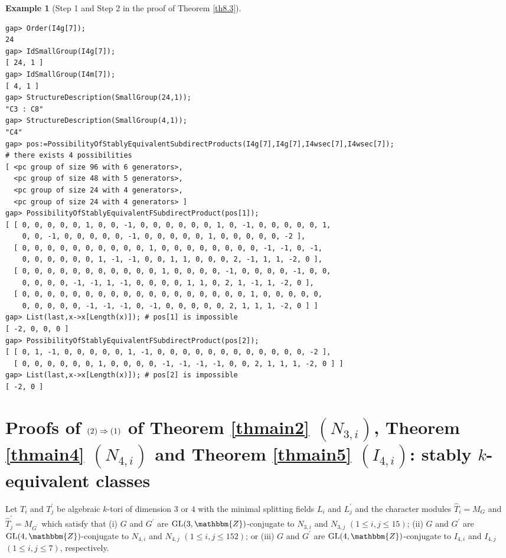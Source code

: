 \documentclass{amsart}
\theoremstyle{plain}
\theoremstyle{definition}
\newtheorem{example}[theorem]{Example}
\theoremstyle{remark}
\newcommand{\bZ}{\mathbbm{Z}}\newcommand{\bQ}{\mathbbm{Q}}
\newcommand{\GL}{{\rm GL}}\newcommand{\SL}{{\rm SL}}
\newcounter{sub}\def\tr{\mbox{tr }}
\begin{document}
{\begin{example}[Step 1 and Step 2 in the proof of Theorem \ref{th8.3}]
\begin{verbatim}
gap> Order(I4g[7]);
24
gap> IdSmallGroup(I4g[7]);
[ 24, 1 ]
gap> IdSmallGroup(I4m[7]);
[ 4, 1 ]
gap> StructureDescription(SmallGroup(24,1));
"C3 : C8"
gap> StructureDescription(SmallGroup(4,1));
"C4"
gap> pos:=PossibilityOfStablyEquivalentSubdirectProducts(I4g[7],I4g[7],I4wsec[7],I4wsec[7]);
# there exists 4 possibilities 
[ <pc group of size 96 with 6 generators>, 
  <pc group of size 48 with 5 generators>, 
  <pc group of size 24 with 4 generators>, 
  <pc group of size 24 with 4 generators> ]
gap> PossibilityOfStablyEquivalentFSubdirectProduct(pos[1]);
[ [ 0, 0, 0, 0, 0, 1, 0, 0, -1, 0, 0, 0, 0, 0, 0, 1, 0, -1, 0, 0, 0, 0, 0, 1, 
    0, 0, -1, 0, 0, 0, 0, 0, -1, 0, 0, 0, 0, 0, 1, 0, 0, 0, 0, 0, -2 ], 
  [ 0, 0, 0, 0, 0, 0, 0, 0, 0, 0, 1, 0, 0, 0, 0, 0, 0, 0, 0, -1, -1, 0, -1, 
    0, 0, 0, 0, 0, 0, 1, -1, -1, 0, 0, 1, 1, 0, 0, 0, 2, -1, 1, 1, -2, 0 ], 
  [ 0, 0, 0, 0, 0, 0, 0, 0, 0, 0, 0, 1, 0, 0, 0, 0, -1, 0, 0, 0, 0, -1, 0, 0, 
    0, 0, 0, 0, -1, -1, 1, -1, 0, 0, 0, 0, 1, 1, 0, 2, 1, -1, 1, -2, 0 ], 
  [ 0, 0, 0, 0, 0, 0, 0, 0, 0, 0, 0, 0, 0, 0, 0, 0, 0, 0, 1, 0, 0, 0, 0, 0, 
    0, 0, 0, 0, 0, -1, -1, -1, 0, -1, 0, 0, 0, 0, 0, 2, 1, 1, 1, -2, 0 ] ]
gap> List(last,x->x[Length(x)]); # pos[1] is impossible 
[ -2, 0, 0, 0 ]
gap> PossibilityOfStablyEquivalentFSubdirectProduct(pos[2]);
[ [ 0, 1, -1, 0, 0, 0, 0, 0, 1, -1, 0, 0, 0, 0, 0, 0, 0, 0, 0, 0, 0, 0, -2 ], 
  [ 0, 0, 0, 0, 0, 0, 1, 0, 0, 0, 0, -1, -1, -1, -1, 0, 0, 2, 1, 1, 1, -2, 0 ] ]
gap> List(last,x->x[Length(x)]); # pos[2] is impossible 
[ -2, 0 ]
\end{verbatim}
\end{example}

\section{Proofs of ${\rm (2)}\Rightarrow {\rm (1)}$ of {Theorem \ref{thmain2}} $(N_{3,i})$, {Theorem \ref{thmain4}} $(N_{4,i})$ and {Theorem \ref{thmain5}} $(I_{4,i})$: stably $k$-equivalent classes}\label{S9}

Let $T_i$ and $T_j^\prime$ %
be algebraic $k$-tori of dimension $3$ or $4$ 
with the minimal splitting fields $L_i$ and $L^\prime_j$ 
and the character modules 
$\widehat{T}_i=M_G$ and $\widehat{T}^\prime_j=M_{G^\prime}$ 
which satisfy that 
{\rm (i)} $G$ and $G^\prime$ are 
$\GL(3,\bZ)$-conjugate to $N_{3,i}$ and $N_{3,j}$ $(1\leq i,j\leq 15)$; 
{\rm (ii)} $G$ and $G^\prime$ are 
$\GL(4,\bZ)$-conjugate to $N_{4,i}$ and $N_{4,j}$ $(1\leq i,j\leq 152)$; 
or 
{\rm (iii)} $G$ and $G^\prime$ are 
$\GL(4,\bZ)$-conjugate to $I_{4,i}$ and $I_{4,j}$ $(1\leq i,j\leq 7)$, 
respectively. 

}
\end{document}
